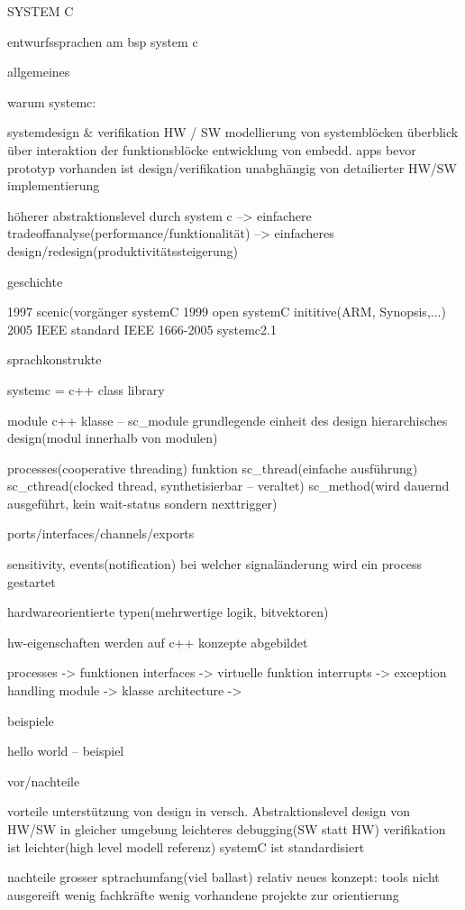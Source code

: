 
SYSTEM C

				entwurfssprachen am bsp system c

allgemeines

	warum systemc:

	systemdesign \& verifikation HW / SW
	modellierung von systemblöcken
	überblick über interaktion der funktionsblöcke
	entwicklung von embedd. apps bevor prototyp vorhanden ist
	design/verifikation unabghängig von detailierter HW/SW implementierung

	höherer abstraktionslevel durch system c
		--> einfachere tradeoffanalyse(performance/funktionalität)
		--> einfacheres design/redesign(produktivitätssteigerung)

geschichte

	1997 scenic(vorgänger systemC
	1999 open systemC inititive(ARM, Synopsis,...)
	2005	IEEE standard IEEE 1666-2005 systemc2.1

sprachkonstrukte

	systemc = c++ class library
	
	module
		c++ klasse – sc\_module
		grundlegende einheit des design
		hierarchisches design(modul innerhalb von modulen)

	processes(cooperative threading)
funktion
sc\_thread(einfache ausführung)
sc\_cthread(clocked thread, synthetisierbar – veraltet)
sc\_method(wird dauernd ausgeführt, kein wait-status sondern nexttrigger)

	ports/interfaces/channels/exports

	sensitivity, events(notification)
		bei welcher signaländerung wird ein process gestartet

	hardwareorientierte typen(mehrwertige logik, bitvektoren)

	hw-eigenschaften werden auf c++ konzepte abgebildet
	
	processes -> funktionen
	interfaces -> virtuelle funktion
	interrupts -> exception handling
	module -> klasse
	architecture -> 

beispiele

	hello world – beispiel
	

vor/nachteile

	vorteile
		unterstützung von design in versch. Abstraktionslevel
		design von HW/SW in gleicher umgebung
		leichteres debugging(SW statt HW)
		verifikation ist leichter(high level modell referenz)
		systemC ist standardisiert

	nachteile
		grosser sptrachumfang(viel ballast)
		relativ neues konzept:
tools nicht ausgereift
wenig fachkräfte
wenig vorhandene projekte zur orientierung

